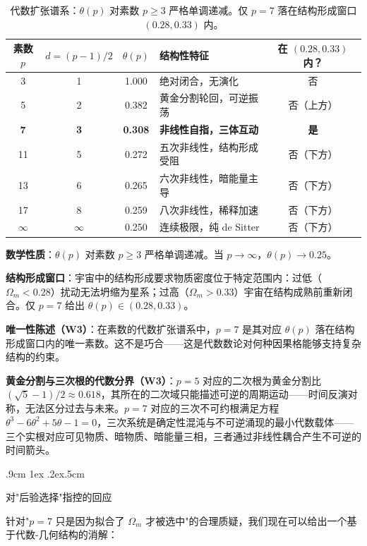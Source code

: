 \documentclass[aps,prd,twocolumn,nofootinbib,floatfix]{revtex4-2}
\makeatletter
\def\subsection{%
  \@startsection{subsection}{2}{\z@}
    {.9cm \@plus1ex \@minus .2ex}{.5cm}
    {\normalfont\large\bfseries\raggedright}%
}
\makeatother
\begin{document}
\begin{table}[!t]
\centering
\begin{tabular}{ccclc}
\hline
素数 $p$ & $d=(p-1)/2$ & $\theta(p)$ & 结构性特征 & 在 $(0.28, 0.33)$ 内？ \\
\hline
3 & 1 & 1.000 & 绝对闭合，无演化 & 否 \\
5 & 2 & 0.382 & 黄金分割轮回，可逆振荡 & 否（上方） \\
\textbf{7} & \textbf{3} & \textbf{0.308} & \textbf{非线性自指，三体互动} & \textbf{是} \\
11 & 5 & 0.272 & 五次非线性，结构形成受阻 & 否（下方） \\
13 & 6 & 0.265 & 六次非线性，暗能量主导 & 否（下方） \\
17 & 8 & 0.259 & 八次非线性，稀释加速 & 否（下方） \\
$\infty$ & $\infty$ & 0.250 & 连续极限，纯 de Sitter & 否（下方） \\
\hline
\end{tabular}
\caption{代数扩张谱系：$\theta(p)$ 对素数 $p \ge 3$ 严格单调递减。仅 $p=7$ 落在结构形成窗口 $(0.28, 0.33)$ 内。}
\label{tab:expansion_spectrum}
\end{table}

\textbf{数学性质}：$\theta(p)$ 对素数 $p \ge 3$ 严格单调递减。当 $p \to \infty$，$\theta(p) \to 0.25$。

\textbf{结构形成窗口}：宇宙中的结构形成要求物质密度位于特定范围内：过低（$\Omega_m < 0.28$）扰动无法坍缩为星系；过高（$\Omega_m > 0.33$）宇宙在结构成熟前重新闭合。仅 $p=7$ 给出 $\theta(p) \in (0.28, 0.33)$。

\textbf{唯一性陈述（W3）}：在素数的代数扩张谱系中，$p=7$ 是其对应 $\theta(p)$ 落在结构形成窗口内的唯一素数。这不是巧合——这是代数数论对何种因果格能够支持复杂结构的约束。

\textbf{黄金分割与三次根的代数分界（W3）}：$p=5$ 对应的二次根为黄金分割比 $(\sqrt{5}-1)/2 \approx 0.618$，其所在的二次域只能描述可逆的周期运动——时间反演对称，无法区分过去与未来。$p=7$ 对应的三次不可约根满足方程 $\theta^3 - 6\theta^2 + 5\theta - 1 = 0$，三次系统是确定性混沌与不可逆涌现的最小代数载体——三个实根对应可见物质、暗物质、暗能量三相，三者通过非线性耦合产生不可逆的时间箭头。

\subsection{对"后验选择"指控的回应}

针对"$p=7$ 只是因为拟合了 $\Omega_m$ 才被选中"的合理质疑，我们现在可以给出一个基于代数-几何结构的消解：
\end{document}
